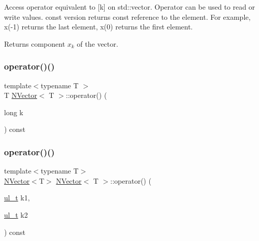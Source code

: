 Access operator equivalent to {\ttfamily \mbox{[}k\mbox{]}} on {\ttfamily std\+::vector}. Operator can be used to read or write values. {\ttfamily const} version returns {\ttfamily const} reference to the element. For example, {\ttfamily x(-\/1)} returns the last element, {\ttfamily x(0)} returns the first element. \begin{DoxyReturn}{Returns}
component $ x_{k} $ of the vector. 
\end{DoxyReturn}
\mbox{\label{class_n_vector_a51d4a2c505c1434f45e8f80d1d77eda5}} 
\subsubsection{\texorpdfstring{operator()()}{operator()()}\hspace{0.1cm}{\footnotesize\ttfamily [2/4]}}
{\footnotesize\ttfamily template$<$typename T $>$ \\
T \mbox{\hyperlink{class_n_vector}{N\+Vector}}$<$ T $>$\+::operator() (\begin{DoxyParamCaption}\item[{long}]{k }\end{DoxyParamCaption}) const}

\mbox{\label{class_n_vector_a8778fdc3c0a27a7930fda3f2a7155e96}} 
\subsubsection{\texorpdfstring{operator()()}{operator()()}\hspace{0.1cm}{\footnotesize\ttfamily [3/4]}}
{\footnotesize\ttfamily template$<$typename T$>$ \\
\mbox{\hyperlink{class_n_vector}{N\+Vector}}$<$T$>$ \mbox{\hyperlink{class_n_vector}{N\+Vector}}$<$ T $>$\+::operator() (\begin{DoxyParamCaption}\item[{\mbox{\hyperlink{group___n_algebra_ga1b140a2034db3f5dfe18a987745df43a}{ul\+\_\+t}}}]{k1,  }\item[{\mbox{\hyperlink{group___n_algebra_ga1b140a2034db3f5dfe18a987745df43a}{ul\+\_\+t}}}]{k2 }\end{DoxyParamCaption}) const\hspace{0.3cm}{\ttfamily [inline]}}



